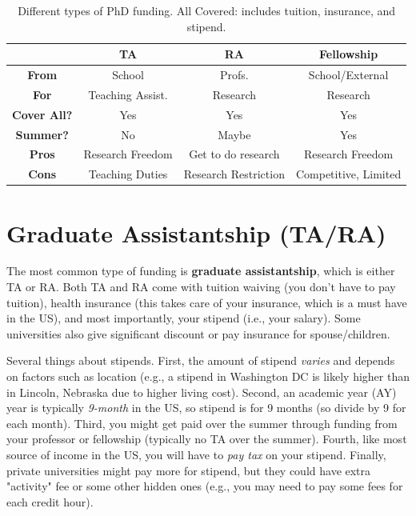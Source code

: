 \documentclass[oneside,11pt]{memoir}
\begin{document}
\begin{table}
  \centering
  \footnotesize
  \caption{Different types of PhD funding. All Covered: includes tuition, insurance, and stipend.}\label{tab:funding}
  \begin{tabular}{c|c|c|c}
    \toprule
    &\textbf{TA}&\textbf{RA}&\textbf{Fellowship}\\
    \midrule
    \textbf{From} & School & Profs. & School/External\\
    \textbf{For}                  & Teaching Assist.       & Research                        & Research                              \\
    \textbf{Cover All?} & Yes                      & Yes                             & Yes                                   \\
    \textbf{Summer?}              & No                       & Maybe                           & Yes                                   \\
    \midrule
    \textbf{Pros}                 & Research Freedom         & Get to do research              & Research Freedom                      \\
    \textbf{Cons}                 & Teaching Duties           & Research Restriction & Competitive, Limited             \\
    \bottomrule
  \end{tabular}
\end{table}

\section{Graduate Assistantship (TA/RA)}
The most common type of funding is \textbf{graduate assistantship}, which is either TA or RA. Both TA and RA come with tuition waiving (you don't have to pay tuition), health insurance (this takes care of your insurance, which is a must have in the US), and most importantly, your stipend (i.e., your salary). Some universities also give significant discount or pay insurance for spouse/children.

Several things about stipends.  First, the amount of stipend \emph{varies} and depends on factors such as location (e.g., a stipend in Washington DC is likely higher than in Lincoln, Nebraska due to higher living cost). Second, an academic year (AY)  year is typically \emph{9-month} in the US, so stipend is for 9 months (so divide by 9 for each month). Third, you might get paid over the summer through funding from your professor or fellowship (typically no TA over the summer). Fourth, like most source of income in the US, you will have to \emph{pay tax} on your stipend.  Finally, private universities might pay more for stipend, but they could have extra "activity" fee or some other hidden ones (e.g., you may need to pay some fees for each credit hour).
\end{document}
